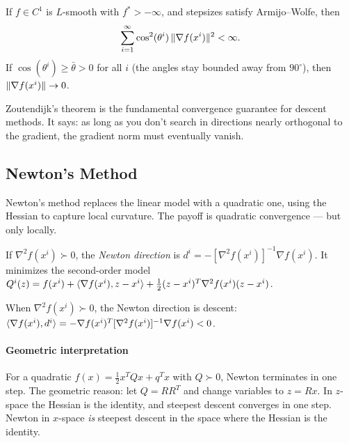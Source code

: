 \begin{thm}\label{thm:zoutendijk}
	If $f \in C^1$ is $L$-smooth with $f^* > -\infty$, and stepsizes satisfy Armijo--Wolfe, then
	\begin{equation}\label{eq:zoutendijk}
		\sum_{i=1}^{\infty} \cos^2(\theta^i)\, \lVert\nabla f(x^i)\rVert^2 < \infty.
	\end{equation}
	If $\cos(\theta^i) \geq \bar{\theta} > 0$ for all $i$ (the angles stay bounded away from $90^\circ$), then $\lVert\nabla f(x^i)\rVert \to 0$.
\end{thm}

Zoutendijk's theorem is the fundamental convergence guarantee for descent methods.
It says: as long as you don't search in directions nearly orthogonal to the gradient, the gradient norm must eventually vanish.


\subsection{Newton's Method}\label{ssec:newton-multivariate}

Newton's method replaces the linear model with a quadratic one, using the Hessian to capture local curvature.
The payoff is quadratic convergence --- but only locally.

\begin{defn}\label{def:newton-dir}
	If $\nabla^2 f(x^i) \succ 0$, the \textit{Newton direction} is
	$d^i = -[\nabla^2 f(x^i)]^{-1} \nabla f(x^i)$.
	It minimizes the second-order model $Q^i(z) = f(x^i) + \langle\nabla f(x^i), z - x^i\rangle + \frac{1}{2}(z - x^i)^T \nabla^2 f(x^i)(z - x^i)$.
\end{defn}

When $\nabla^2 f(x^i) \succ 0$, the Newton direction is descent: $\langle\nabla f(x^i), d^i\rangle = -\nabla f(x^i)^T [\nabla^2 f(x^i)]^{-1} \nabla f(x^i) < 0$.

\paragraph{Geometric interpretation}

For a quadratic $f(x) = \frac{1}{2} x^T Q x + q^T x$ with $Q \succ 0$, Newton terminates in one step.
The geometric reason: let $Q = RR^T$ and change variables to $z = Rx$.
In $z$-space the Hessian is the identity, and steepest descent converges in one step.
Newton in $x$-space \emph{is} steepest descent in the space where the Hessian is the identity.

